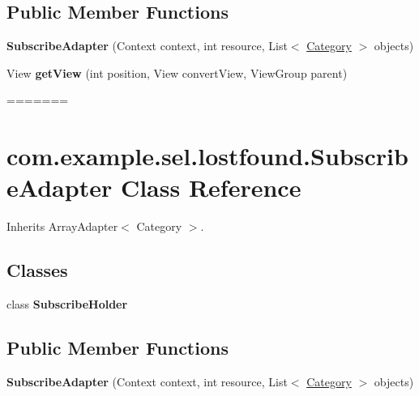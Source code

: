 \subsection*{Public Member Functions}
\begin{DoxyCompactItemize}
\item 
\hypertarget{classcom_1_1example_1_1sel_1_1lostfound_1_1SubscribeAdapter_ad5670875fa5fcc236d9c794303f04369}{{\bfseries Subscribe\-Adapter} (Context context, int resource, List$<$ \hyperlink{classcom_1_1example_1_1sel_1_1lostfound_1_1Category}{Category} $>$ objects)}\label{classcom_1_1example_1_1sel_1_1lostfound_1_1SubscribeAdapter_ad5670875fa5fcc236d9c794303f04369}

\item 
\hypertarget{classcom_1_1example_1_1sel_1_1lostfound_1_1SubscribeAdapter_a942f195e46312808aff706a8a4e15e02}{View {\bfseries get\-View} (int position, View convert\-View, View\-Group parent)}\label{classcom_1_1example_1_1sel_1_1lostfound_1_1SubscribeAdapter_a942f195e46312808aff706a8a4e15e02}
=======
\hypertarget{classcom_1_1example_1_1sel_1_1lostfound_1_1SubscribeAdapter}{\section{com.\-example.\-sel.\-lostfound.\-Subscribe\-Adapter \-Class \-Reference}
\label{classcom_1_1example_1_1sel_1_1lostfound_1_1SubscribeAdapter}
}


\-Inherits \-Array\-Adapter$<$ Category $>$.

\subsection*{\-Classes}
\begin{DoxyCompactItemize}
\item 
class {\bfseries \-Subscribe\-Holder}
\end{DoxyCompactItemize}
\subsection*{\-Public \-Member \-Functions}
\begin{DoxyCompactItemize}
\item 
\hypertarget{classcom_1_1example_1_1sel_1_1lostfound_1_1SubscribeAdapter_ad5670875fa5fcc236d9c794303f04369}{{\bfseries \-Subscribe\-Adapter} (\-Context context, int resource, \-List$<$ \hyperlink{classcom_1_1example_1_1sel_1_1lostfound_1_1Category}{\-Category} $>$ objects)}\label{classcom_1_1example_1_1sel_1_1lostfound_1_1SubscribeAdapter_ad5670875fa5fcc236d9c794303f04369}


\end{DoxyCompactItemize}
\end{DoxyCompactItemize}
